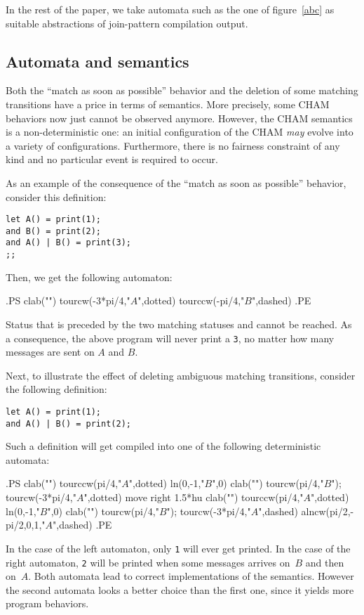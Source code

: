 In the rest of the paper, we take automata such as the one of
figure~\ref{abc} as suitable abstractions
of join-pattern compilation output.

\subsection{Automata and semantics}

Both the ``match as soon as possible'' behavior and the deletion of
some matching transitions have a price in terms of semantics.
More precisely, some CHAM behaviors now just cannot be observed
anymore.
However,
the CHAM semantics is a non-deterministic one: an initial
configuration of the CHAM {\em may} evolve into a variety of configurations.
Furthermore, there is no fairness constraint of any kind and
no particular event is required to occur.

As an example of the consequence of the ``match as soon as possible''
behavior, consider this definition:
\begin{verbatim}
let A() = print(1);
and B() = print(2);
and A() | B() = print(3);
;;
\end{verbatim}
Then, we get the following automaton:
\begin{toimage}
.PS
clab("")
 tourcw(-3*pi/4,"$A$",dotted)
 tourccw(-pi/4,"$B$",dashed)
.PE
\end{toimage}
\showgraph
Status  that is preceded by the two matching statuses
 and  cannot be reached. As a consequence, the
above program will never print a {\tt 3}, no matter how many messages
are sent on $A$ and $B$.

Next, to illustrate the effect of deleting ambiguous matching
transitions, consider the following definition:
\begin{verbatim}
let A() = print(1);
and A() | B() = print(2);
\end{verbatim}
Such a definition will get compiled into one of the following
deterministic automata:
\begin{toimage}
.PS
{clab("")
 tourccw(pi/4,"$A$",dotted)
 {ln(0,-1,"$B$",0)
   clab("")
   tourcw(pi/4,"$B$");
   tourcw(-3*pi/4,"$A$",dotted)
 }
}
move right 1.5*hu
{clab("")
 tourccw(pi/4,"$A$",dotted)
 {ln(0,-1,"$B$",0)
   clab("")
   tourcw(pi/4,"$B$");
   tourcw(-3*pi/4,"$A$",dashed)
   {alncw(pi/2,-pi/2,0,1,"$A$",dashed)}   
 }
}
.PE
\end{toimage}
\showgraph
In the case of the left automaton, only {\tt 1} will ever get printed.
In the case of the right
automaton, {\tt 2} will be printed when some messages arrives on~$B$
and then on~$A$.
Both automata lead to correct implementations of the semantics. However
the second automata looks a better choice than the first one, since it
yields more program behaviors.


